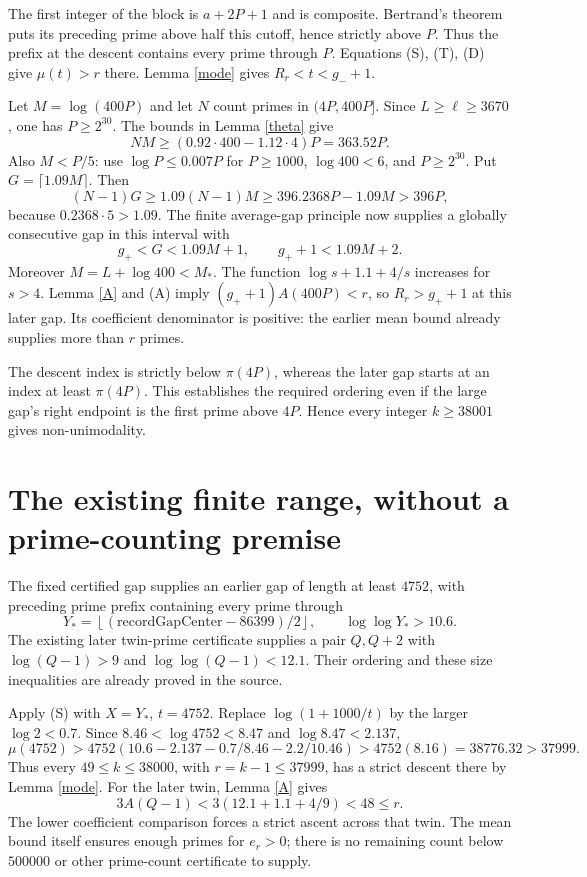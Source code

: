 \documentclass[11pt]{article}
\begin{document}
The first integer of the block is $a+2P+1$ and is composite.
Bertrand's theorem puts its preceding prime above half this cutoff, hence
strictly above $P$. Thus the prefix at the descent contains every prime
through $P$. Equations (S), (T), (D) give $\mu(t)>r$ there.
Lemma \ref{mode} gives $R_r<t<g_-+1$.

Let $M=\log(400P)$ and let $N$ count primes in $(4P,400P]$.
Since $L\ge\ell\ge3670$, one has $P\ge2^{30}$.
The bounds in Lemma \ref{theta} give
\[
 NM\ge(0.92\cdot400-1.12\cdot4)P=363.52P.
\]
Also $M<P/5$: use $\log P\le0.007P$ for $P\ge1000$,
$\log400<6$, and $P\ge2^{30}$.
Put $G=\lceil1.09M\rceil$. Then
\[
 (N-1)G\ge1.09(N-1)M
 \ge396.2368P-1.09M>396P,
\]
because $0.2368\cdot5>1.09$.
The finite average-gap principle now supplies a globally consecutive gap
in this interval with
\[
 g_+<G<1.09M+1,\qquad g_++1<1.09M+2.
\]
Moreover $M=L+\log400<M_*$. The function
$\log s+1.1+4/s$ increases for $s>4$.
Lemma \ref{A} and (A) imply $(g_++1)A(400P)<r$, so
$R_r>g_++1$ at this later gap. Its coefficient denominator is positive:
the earlier mean bound already supplies more than $r$ primes.

The descent index is strictly below $\pi(4P)$, whereas the later gap
starts at an index at least $\pi(4P)$. This establishes the required
ordering even if the large gap's right endpoint is the first prime
above $4P$. Hence every integer $k\ge38001$ gives non-unimodality.

\section{The existing finite range, without a prime-counting premise}
The fixed certified gap supplies an earlier gap of length at least $4752$,
with preceding prime prefix containing every prime through
\[
 Y_*=\left\lfloor(\mathrm{recordGapCenter}-86399)/2\right\rfloor,
 \qquad \log\log Y_*>10.6.
\]
The existing later twin-prime certificate supplies a pair $Q,Q+2$ with
$\log(Q-1)>9$ and $\log\log(Q-1)<12.1$.
Their ordering and these size inequalities are already proved in the source.

Apply (S) with $X=Y_*$, $t=4752$.
Replace $\log(1+1000/t)$ by the larger $\log2<0.7$.
Since $8.46<\log4752<8.47$ and $\log8.47<2.137$,
\[
 \mu(4752)>
 4752(10.6-2.137-0.7/8.46-2.2/10.46)
 >4752(8.16)=38776.32>37999.
\]
Thus every $49\le k\le38000$, with $r=k-1\le37999$,
has a strict descent there by Lemma \ref{mode}.
For the later twin, Lemma \ref{A} gives
\[
             3A(Q-1)<3(12.1+1.1+4/9)<48\le r.
\]
The lower coefficient comparison forces a strict ascent across that twin.
The mean bound itself ensures enough primes for $e_r>0$; there is no
remaining count below $500000$ or other prime-count certificate to supply.
\end{document}
